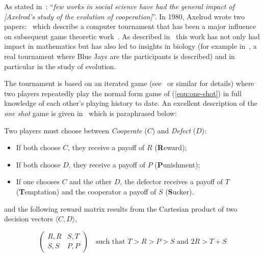 \documentclass{article}
\begin{document}
As stated in~\cite{Bendor1991}: ``\textit{few works in social science have had
the general impact of [Axelrod's study of the evolution of cooperation]}''.  In
1980, Axelrod wrote two papers:~\cite{Axelrod1980a,Axelrod1980b} which
describe a computer tournament that has been a major influence on
subsequent game theoretic work~\cite{Banks1990, Bendor1991, Boyd1987, Chellapilla1999,
DavidB1993, Doebeli2005, Ellison1994, Gotts2003, Hilbe2013, Isaac2008,
Kraines1989, Lee2015, Lorberbaum1994, Milgrom1982, Molander1985, Murnighan2015,
Press2012, Stephens2002, Stewart2012}. As described in~\cite{Bendor1991} this
work has not only had impact in mathematics but has also led to insights in
biology (for example in~\cite{Stephens2002}, a real tournament where Blue Jays
are the participants is described) and in particular in the study of evolution.

The tournament is based on an iterated game (see~\cite{Maschler2013} or similar
for details) where two players repeatedly play the normal form game of
(\ref{equ:one-shot}) in full knowledge of each other's playing history to date.
An excellent description of the \textit{one shot} game is given
in~\cite{Gotts2003} which is paraphrased below:

Two players must choose between \textit{Cooperate} (\(C\)) and \textit{Defect}
(\(D\)):

\begin{itemize}
    \item If both choose \(C\), they receive a payoff of \(R\)
        (\textbf{R}eward);
    \item If both choose \(D\), they receive a payoff of \(P\)
        (\textbf{P}unishment);
    \item If one chooses \(C\) and the other \(D\), the defector receives a
        payoff of \(T\) (\textbf{T}emptation) and the cooperator a payoff of
        \(S\) (\textbf{S}ucker).
\end{itemize}

and the following reward matrix results from the Cartesian product of
two decision vectors $\langle C, D \rangle$,

\begin{equation}
    \begin{pmatrix}
        R,R & S,T\\
        S,S & P,P
    \end{pmatrix}\quad\text{such that } T>R>P>S \text{ and } 2R > T + S
    \label{equ:one-shot}
\end{equation}
\end{document}
